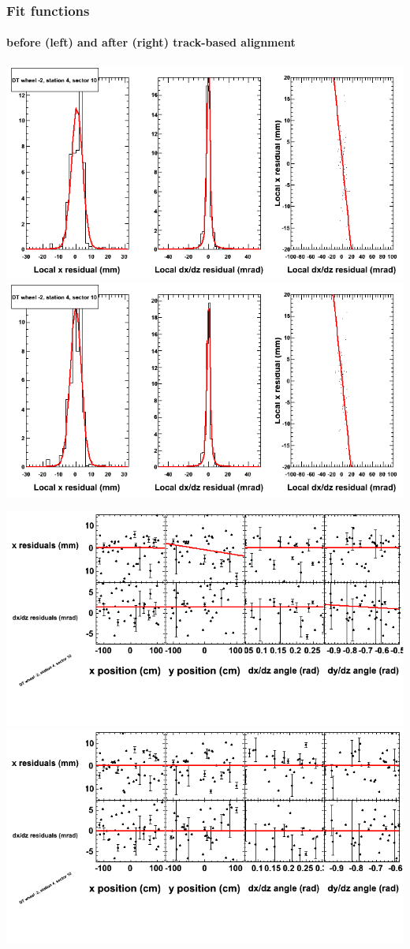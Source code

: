 \documentclass[compress]{beamer}
\begin{document}
\begin{frame}
\frametitle{Fit functions}
\framesubtitle{before (left) and after (right) track-based alignment}
\includegraphics[width=0.5\linewidth]{fitfunctions_re01/MBwhAst4sec10_bellcurves.png} \includegraphics[width=0.5\linewidth]{fitfunctions_re05/MBwhAst4sec10_bellcurves.png}

\includegraphics[width=0.5\linewidth]{fitfunctions_re01/MBwhAst4sec10_polynomials.png} \includegraphics[width=0.5\linewidth]{fitfunctions_re05/MBwhAst4sec10_polynomials.png}
\end{frame}
\end{document}
